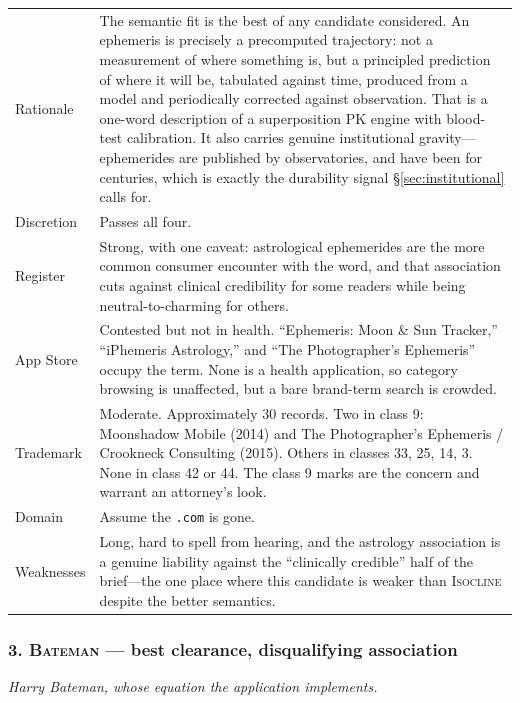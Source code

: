 \documentclass[11pt,a4paper]{article}
\newcommand{\bad}[1]{\obs{#1}}
\newcommand{\good}[1]{#1}
\newcommand{\mixed}[1]{\textcolor{mid}{#1}}
\newcommand{\code}[1]{\texttt{\small #1}}
\newcommand{\name}[1]{\textsc{#1}}
\begin{document}
\begin{longtable}{@{}L{3.0cm}L{12.1cm}@{}}
\toprule
\endhead
Rationale &
The semantic fit is the best of any candidate considered. An ephemeris
is precisely a precomputed trajectory: not a measurement of where
something is, but a principled prediction of where it will be, tabulated
against time, produced from a model and periodically corrected against
observation. That is a one-word description of a superposition PK
engine with blood-test calibration. It also carries genuine
institutional gravity---ephemerides are published by observatories, and
have been for centuries, which is exactly the durability signal
\S\ref{sec:institutional} calls for. \\[0.35em]
Discretion & \good{Passes all four.} \\[0.35em]
Register & \good{Strong}, with one caveat: astrological ephemerides
are the more common consumer encounter with the word, and that
association cuts against clinical credibility for some readers while
being neutral-to-charming for others. \\[0.35em]
App Store & \mixed{Contested but not in health.} ``Ephemeris: Moon \&
Sun Tracker,'' ``iPhemeris Astrology,'' and ``The Photographer's
Ephemeris'' occupy the term. None is a health application, so category
browsing is unaffected, but a bare brand-term search is crowded. \\[0.35em]
Trademark & \mixed{Moderate.} Approximately 30 records. Two in class 9:
Moonshadow Mobile (2014) and The Photographer's Ephemeris / Crookneck
Consulting (2015). Others in classes 33, 25, 14, 3. \good{None in class
42 or 44.} The class 9 marks are the concern and warrant an attorney's
look. \\[0.35em]
Domain & \bad{Unverified.} Assume the \code{.com} is gone. \\[0.35em]
Weaknesses & Long, hard to spell from hearing, and the astrology
association is a genuine liability against the ``clinically credible''
half of the brief---the one place where this candidate is weaker than
\name{Isocline} despite the better semantics. \\
\bottomrule
\end{longtable}

\subsubsection*{3. \name{Bateman} --- best clearance, disqualifying association}

\emph{Harry Bateman, whose equation the application implements.}
\end{document}
